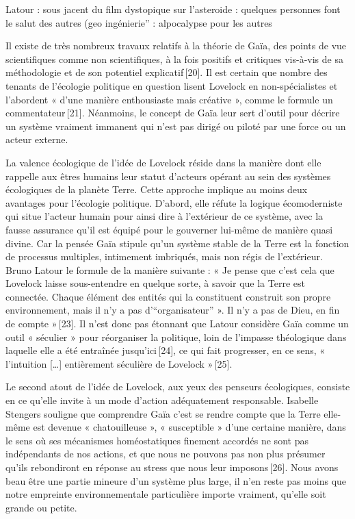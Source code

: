         Latour : sous jacent du film dystopique sur l’asteroide : quelques personnes font le salut des autres (geo ingénierie” : alpocalypse pour les autres
\begin{singlequote}

        Il existe de très nombreux travaux relatifs à la théorie de Gaïa, des points de vue scientifiques comme non scientifiques, à la fois positifs et critiques vis-à-vis de sa méthodologie et de son potentiel explicatif [20]. Il est certain que nombre des tenants de l’écologie politique en question lisent Lovelock en non-spécialistes et l’abordent « d’une manière enthousiaste mais créative », comme le formule un commentateur [21]. Néanmoins, le concept de Gaïa leur sert d’outil pour décrire un système vraiment immanent qui n’est pas dirigé ou piloté par une force ou un acteur externe.

        La valence écologique de l’idée de Lovelock réside dans la manière dont elle rappelle aux êtres humains leur statut d’acteurs opérant au sein des systèmes écologiques de la planète Terre. Cette approche implique au moins deux avantages pour l’écologie politique. D’abord, elle réfute la logique écomoderniste qui situe l’acteur humain pour ainsi dire à l’extérieur de ce système, avec la fausse assurance qu’il est équipé pour le gouverner lui-même de manière quasi divine. Car la pensée Gaïa stipule qu’un système stable de la Terre est la fonction de processus multiples, intimement imbriqués, mais non régis de l’extérieur. Bruno Latour le formule de la manière suivante : « Je pense que c’est cela que Lovelock laisse sous-entendre en quelque sorte, à savoir que la Terre est connectée. Chaque élément des entités qui la constituent construit son propre environnement, mais il n’y a pas d’“organisateur” ». Il n’y a pas de Dieu, en fin de compte » [23]. Il n’est donc pas étonnant que Latour considère Gaïa comme un outil « séculier » pour réorganiser la politique, loin de l’impasse théologique dans laquelle elle a été entraînée jusqu’ici [24], ce qui fait progresser, en ce sens, « l’intuition […] entièrement séculière de Lovelock » [25]. 

        Le second atout de l’idée de Lovelock, aux yeux des penseurs écologiques, consiste en ce qu’elle invite à un mode d’action adéquatement responsable. Isabelle Stengers souligne que comprendre Gaïa c’est se rendre compte que la Terre elle-même est devenue « chatouilleuse », « susceptible » d’une certaine manière, dans le sens où ses mécanismes homéostatiques finement accordés ne sont pas indépendants de nos actions, et que nous ne pouvons pas non plus présumer qu’ils rebondiront en réponse au stress que nous leur imposons [26]. Nous avons beau être une partie mineure d’un système plus large, il n’en reste pas moins que notre empreinte environnementale particulière importe vraiment, qu’elle soit grande ou petite.
    \end{singlequote}

